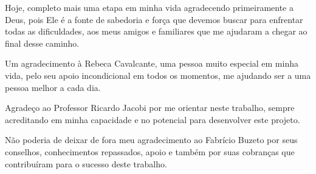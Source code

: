 \begin{agradecimentos}
	
	Hoje, completo mais uma etapa em minha vida agradecendo primeiramente a Deus, pois Ele é a 
	fonte de sabedoria e força que devemos buscar para enfrentar todas as dificuldades, aos meus 
	amigos e familiares que me ajudaram a chegar ao final desse caminho. 
	
	Um agradecimento à Rebeca Cavalcante, uma pessoa muito especial em minha vida, pelo seu apoio incondicional em todos os
	momentos, me ajudando ser a uma pessoa melhor a cada dia.
	
	Agradeço ao Professor Ricardo Jacobi por me orientar neste trabalho, sempre acreditando em minha capacidade 
	e no potencial para desenvolver este projeto. 
	 
	Não poderia de deixar de fora meu agradecimento ao Fabrício Buzeto por seus conselhos, conhecimentos repassados, apoio 
	e também por suas cobranças que contribuíram para o sucesso deste trabalho.   
	
\end{agradecimentos}